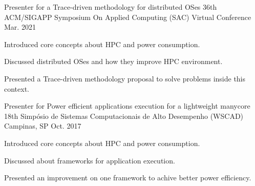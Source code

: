 

\begin{cventries}


  \cventry
    {Presenter for a Trace-driven methodology for distributed OSes} %
    {36th ACM/SIGAPP Symposium On Applied Computing (SAC)} %
    {Virtual Conference} %
    {Mar. 2021} %
    {
      \begin{cvitems} %
        \item {Introduced core concepts about HPC and power consumption.}
        \item {Discussed distributed OSes and how they improve HPC environment.}
        \item {Presented a Trace-driven methodology proposal to solve problems inside this context.}
      \end{cvitems}
    }


  \cventry
    {Presenter for Power efficient applications execution for a lightweight manycore} %
    {18th Simpósio de Sistemas Computacionais de Alto Desempenho (WSCAD)} %
    {Campinas, SP} %
    {Oct. 2017} %
    {
      \begin{cvitems} %
        \item {Introduced core concepts about HPC and power consumption.}
        \item {Discussed about frameworks for application execution.}
        \item {Presented an improvement on one framework to achive better power
          efficiency.}
      \end{cvitems}
    }

\end{cventries}
